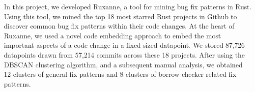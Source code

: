 In this project, we developed Ruxanne, a tool for mining bug fix patterns in Rust. Using this tool, we mined the top 18 most starred Rust projects in Github to discover common bug fix patterns within their code changes. At the heart of Ruxanne, we used a novel code embedding approach to embed the most important aspects of a code change in a fixed sized datapoint. We stored 87,726 datapoints drawn from 57,214 commits across these 18 projects. After using the DBSCAN clustering algorithm, and a subsequent manual analysis, we obtained 12 clusters of general fix patterns and 8 clusters of borrow-checker related fix patterns.